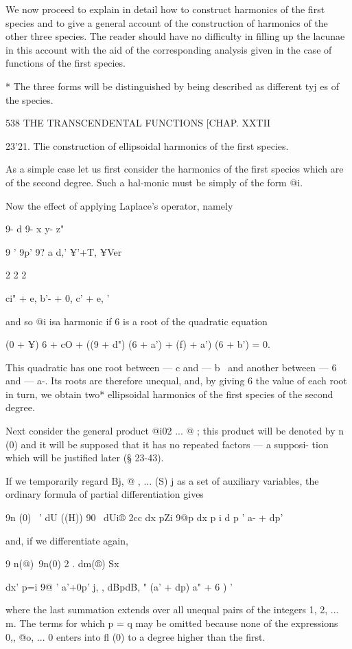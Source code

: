 We now proceed to explain in detail how to construct harmonics of the
first species and to give a general account of the construction of
harmonics of the other three species. The reader should have no
difficulty in filling up the lacunae in this account with the aid of
the corresponding analysis given in the case of functions of the first
species.

* The three forms will be distinguished by being described as
different tyj es of the species.



538 THE TRANSCENDENTAL FUNCTIONS [CHAP. XXTII

23'21. Tlie construction of ellipsoidal harmonics of the first
species.

As a simple case let us first consider the harmonics of the first
species which are of the second degree. Such a hal-monic must be
simply of the form @i.

Now the effect of applying Laplace's operator, namely

9- d 9- x y- z"

9 ' 9p' 9? a d,' ¥'+T, ¥Ver

2 2 2

ci" + e, b'- + 0, c' + e, '

and so @i isa harmonic if 6 is a root of the quadratic equation

(0 + ¥) 6 + cO + ((9 + d") (6 + a') + (f) + a') (6 + b') = 0.

This quadratic has one root between — c and — b~ and another between —
6 and — a-. Its roots are therefore unequal, and, by giving 6 the
value of each root in turn, we obtain two* ellipsoidal harmonics of
the first species of the second degree.

Next consider the general product @i02 ... @ ; this product will be
denoted by n (0) and it will be supposed that it has no repeated
factors — a supposi- tion which will be justified later (§ 23-43).

If we temporarily regard Bj, @ , ... (S) j as a set of auxiliary
variables, the ordinary formula of partial differentiation gives

9n (0) \ ' dU ((H)) 90 \ dUi® 2cc dx pZi 9@p dx p i d p ' a- + dp'

and, if we differentiate again,

9 n(@)\ 9n(0) 2 . dm(®) Sx



dx' p=i 9@ ' a'+0p' j, , dBpdB, " (a' + dp) a" + 6 ) '

where the last summation extends over all unequal pairs of the
integers 1, 2, ... m. The terms for which p = q may be omitted because
none of the expressions 0,, @o, ... 0 enters into fl (0) to a degree
higher than the first.


